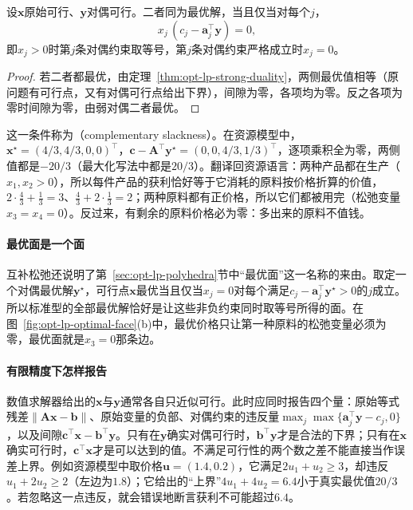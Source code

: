 \begin{theorem}[互补松弛]
\label{thm:opt-lp-complementary-slackness}
设$\bm x$原始可行、$\bm y$对偶可行。二者同为最优解，当且仅当对每个$j$，
\[
  x_j\,(c_j-\bm a_j^\top\bm y)=0,
\]
即$x_j>0$时第$j$条对偶约束取等号，第$j$条对偶约束严格成立时$x_j=0$。
\end{theorem}

\begin{proof}
若二者都最优，由定理~\ref{thm:opt-lp-strong-duality}，两侧最优值相等（原问题有可行点，又有对偶可行点给出下界），间隙为零，各项均为零。反之各项为零时间隙为零，由弱对偶二者最优。
\end{proof}

这一条件称为（complementary slackness）。在资源模型中，$\bm x^\star=(4/3,4/3,0,0)^\top$，$\bm c-\bm A^\top\bm y^\star=(0,0,4/3,1/3)^\top$，逐项乘积全为零，两侧值都是$-20/3$（最大化写法中都是$20/3$）。翻译回资源语言：两种产品都在生产（$x_1,x_2>0$），所以每件产品的获利恰好等于它消耗的原料按价格折算的价值，$2\cdot\frac43+\frac13=3$、$\frac43+2\cdot\frac13=2$；两种原料都有正价格，所以它们都被用完（松弛变量$x_3=x_4=0$）。反过来，有剩余的原料价格必为零：多出来的原料不值钱。

\paragraph{最优面是一个面}
互补松弛还说明了第~\ref{sec:opt-lp-polyhedra}节中“最优面”这一名称的来由。取定一个对偶最优解$\bm y^\star$，可行点$\bm x$最优当且仅当$x_j=0$对每个满足$c_j-\bm a_j^\top\bm y^\star>0$的$j$成立。所以标准型的全部最优解恰好是让这些非负约束同时取等号所得的面。在图~\ref{fig:opt-lp-optimal-face}(b)中，最优价格只让第一种原料的松弛变量必须为零，最优面就是$x_3=0$那条边。

\paragraph{有限精度下怎样报告}
数值求解器给出的$\bm x$与$\bm y$通常各自只近似可行。此时应同时报告四个量：原始等式残差$\lVert\bm A\bm x-\bm b\rVert$、原始变量的负部、对偶约束的违反量$\max_j\max\{\bm a_j^\top\bm y-c_j,0\}$，以及间隙$\bm c^\top\bm x-\bm b^\top\bm y$。只有在$\bm y$确实对偶可行时，$\bm b^\top\bm y$才是合法的下界；只有在$\bm x$确实可行时，$\bm c^\top\bm x$才是可以达到的值。不满足可行性的两个数之差不能直接当作误差上界。例如资源模型中取价格$\bm u=(1.4,0.2)$，它满足$2u_1+u_2\ge3$，却违反$u_1+2u_2\ge2$（左边为$1.8$）；它给出的“上界”$4u_1+4u_2=6.4$小于真实最优值$20/3$。若忽略这一点违反，就会错误地断言获利不可能超过$6.4$。

